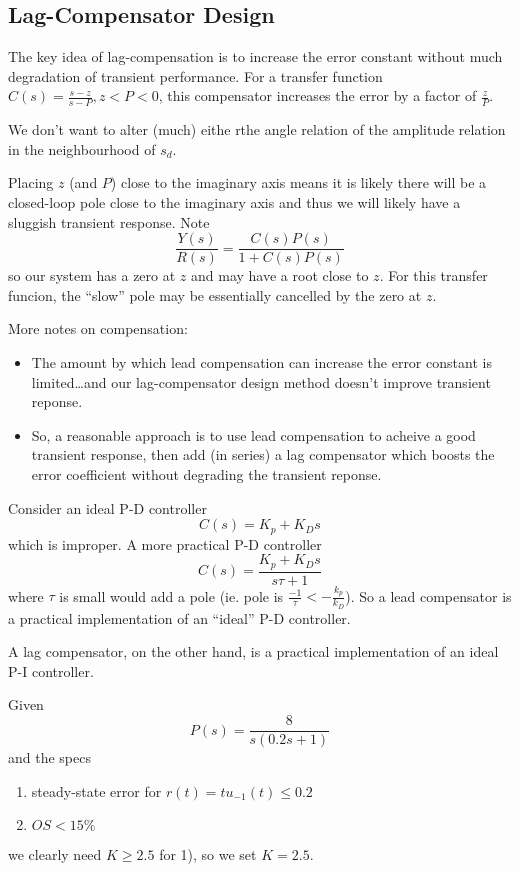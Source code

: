 \documentclass[12pt]{article}
\begin{document}
\subsection{Lag-Compensator Design}
The key idea of lag-compensation is to increase the error constant without much degradation of transient performance. For a transfer function $C(s) = \frac{s-z}{s-P}, z < P < 0$, this compensator increases the error by a factor of $\frac{z}{P}$.

We don't want to alter (much) eithe rthe angle relation of the amplitude relation in the neighbourhood of $s_d$.

Placing $z$ (and $P$) close to the imaginary axis means it is likely there will be a closed-loop pole close to the imaginary axis and thus we will likely have a sluggish transient response. Note \[ \frac{Y(s)}{R(s)} = \frac{C(s)P(s)}{1 + C(s)P(s)} \] so our system has a zero at $z$ and may have a root close to $z$. For this transfer funcion, the ``slow'' pole may be essentially cancelled by the zero at $z$.

More notes on compensation:
\begin{itemize}
\item The amount by which lead compensation can increase the error constant is limited\dots and our lag-compensator design method doesn't improve transient reponse.
\item So, a reasonable approach is to use lead compensation to acheive a good transient response, then add (in series) a lag compensator which boosts the error coefficient without degrading the transient reponse.
\end{itemize}

Consider an ideal P-D controller \[ C(s) = K_p + K_Ds \] which is improper. A more practical P-D controller \[ C(s) = \frac{K_p + K_Ds}{s\tau + 1} \] where $\tau$ is small would add a pole (ie. pole is $\frac{-1}{\tau} < -\frac{k_p}{k_D}$). So a lead compensator is a practical implementation of an ``ideal'' P-D controller.

A lag compensator, on the other hand, is a practical implementation of an ideal P-I controller.

Given \[ P(s) = \frac{8}{s(0.2s + 1)} \] and the specs
\begin{enumerate}
\item steady-state error for $r(t) = tu_{-1}(t) \leq 0.2$
\item $OS < 15\%$
\end{enumerate}
we clearly need $K \geq 2.5$ for 1), so we set $K = 2.5$.
\end{document}
